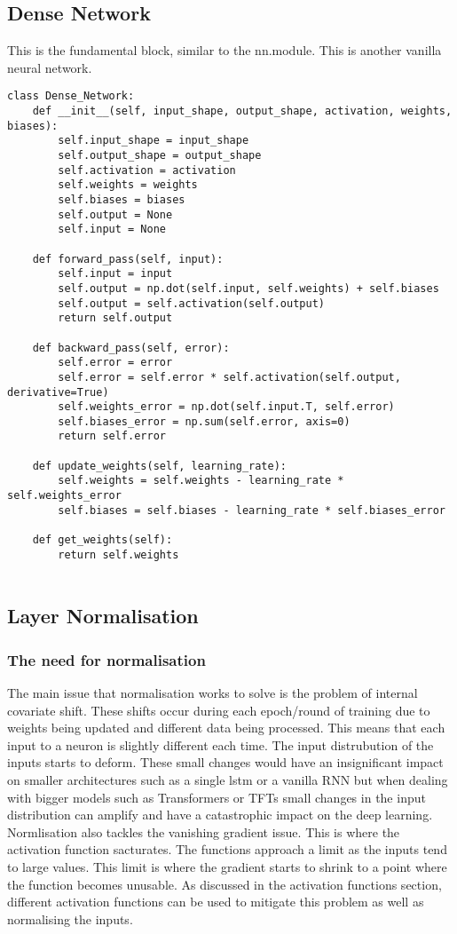 \documentclass{article}
\begin{document}
\subsection{Dense Network}
This is the fundamental block, similar to the nn.module. This is another vanilla
neural network.

\begin{lstlisting}
class Dense_Network:
    def __init__(self, input_shape, output_shape, activation, weights, biases):
        self.input_shape = input_shape
        self.output_shape = output_shape
        self.activation = activation
        self.weights = weights
        self.biases = biases
        self.output = None
        self.input = None

    def forward_pass(self, input):
        self.input = input
        self.output = np.dot(self.input, self.weights) + self.biases
        self.output = self.activation(self.output)
        return self.output

    def backward_pass(self, error):
        self.error = error
        self.error = self.error * self.activation(self.output, derivative=True)
        self.weights_error = np.dot(self.input.T, self.error)
        self.biases_error = np.sum(self.error, axis=0)
        return self.error

    def update_weights(self, learning_rate):
        self.weights = self.weights - learning_rate * self.weights_error
        self.biases = self.biases - learning_rate * self.biases_error

    def get_weights(self):
        return self.weights


\end{lstlisting}

\clearpage

\subsection{Layer Normalisation}

\subsubsection{The need for normalisation}
The main issue that normalisation works to solve is the problem of internal
covariate shift. These shifts occur during each epoch/round of training due to weights
being updated and different data being processed. This means that each input to a
neuron is slightly different each time. The input distrubution of the inputs starts
to deform.
These small changes would have an insignificant impact on smaller architectures
such as a single lstm or a vanilla RNN but when dealing with bigger models such as Transformers
or TFTs small changes in the input distribution can amplify and have a catastrophic
impact on the deep learning.
Normlisation also tackles the vanishing gradient issue. This is where the activation
function sacturates. The functions approach a limit as the inputs tend to large values.
This limit is where the gradient starts to shrink to a point where the function becomes
unusable. As discussed in the activation functions section, different activation functions
can be used to mitigate this problem as well as normalising the inputs.
\end{document}
